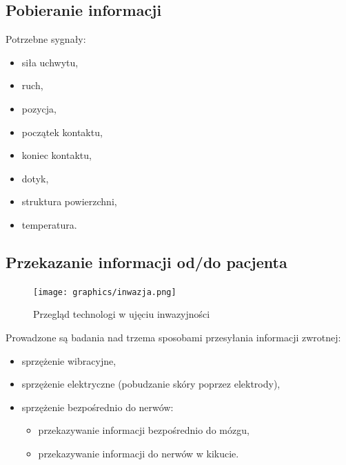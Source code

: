 \documentclass[8pt]{beamer}
\begin{document}
	\subsection{Pobieranie informacji}
		\begin{frame}
		Potrzebne sygnały:
			\begin{itemize}[<+->]
				\item siła uchwytu,
				\item ruch,
				\item pozycja,
				\item początek kontaktu,
				\item koniec kontaktu,
				\item dotyk, 
				\item struktura powierzchni,
				\item temperatura.
			\end{itemize}
		\end{frame}		
		
		
		
		\subsection{Przekazanie informacji od/do pacjenta}	
		\begin{frame}
			\begin{center}
				\begin{figure}
					\texttt{[image: graphics/inwazja.png]}
					\label{graph:mems}	
					\caption{Przegląd technologi w ujęciu inwazyjności \cite{tenore}}
				\end{figure}
			\end{center}
		\end{frame}		
		
		\begin{frame}
			Prowadzone są badania nad trzema sposobami przesyłania informacji zwrotnej:
			\begin{itemize}[<+->]
				\item sprzężenie wibracyjne,
				\item sprzężenie elektryczne (pobudzanie skóry poprzez elektrody),
				\item sprzężenie bezpośrednio do nerwów:
				\begin{itemize}[<+->]
					\item przekazywanie informacji bezpośrednio do mózgu,
					\item przekazywanie informacji do nerwów w kikucie.
				\end{itemize}
			\end{itemize}
		\end{frame}
		
\end{document}
